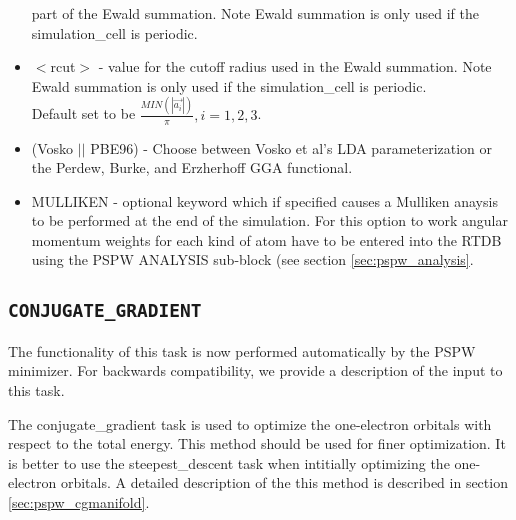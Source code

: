 \begin{itemize}
                          part of the Ewald summation.  Note Ewald summation
                          is only used if the simulation\_cell is periodic.
        \item $<$rcut$>$ - value for the cutoff radius used
                          in the Ewald summation.  Note Ewald summation
                          is only used if the simulation\_cell is periodic. \\
                          Default set to be
                          $\frac{MIN(\left| \vec{a_i} \right|)}{\pi}, i=1,2,3$.
        \item (Vosko $||$ PBE96) - Choose between Vosko et al's LDA 
                               parameterization or the Perdew, Burke, 
                               and Erzherhoff GGA functional.
        \item MULLIKEN - optional keyword which if specified
                         causes a Mulliken anaysis to be performed at
                         the end of the simulation.  For this option
                         to work angular momentum weights for each kind
                         of atom have to be entered into the RTDB using
                         the PSPW ANALYSIS sub-block (see section \ref{sec:pspw_analysis}.
\end{itemize}

\subsection{\tt CONJUGATE\_GRADIENT} 
\label{sec:pspw_conjugate_gradient}
The functionality of this task is now performed automatically by the PSPW minimizer. 
For backwards compatibility, we provide a description of the input to this task.

The conjugate\_gradient task is used to optimize the one-electron orbitals
with respect to the total energy.  This method should be used for finer
optimization. It is better to use the steepest\_descent task when intitially 
optimizing the one-electron orbitals.  A detailed description of the this method
is described in section \ref{sec:pspw_cgmanifold}.


